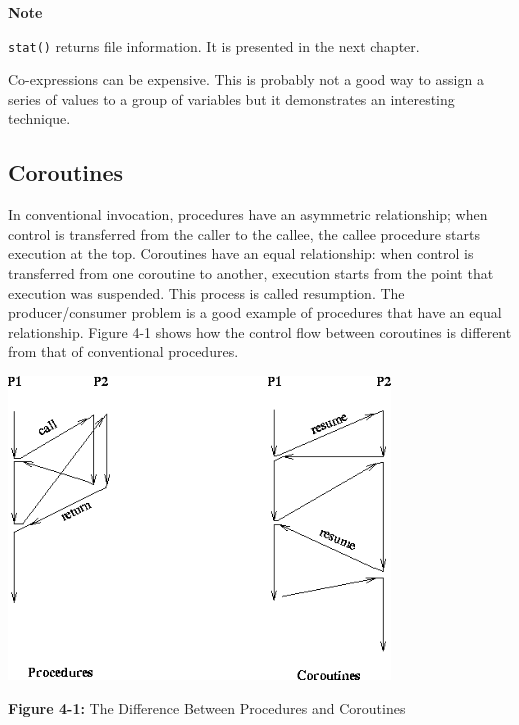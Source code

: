 
{\sffamily\bfseries
Note}

{\sffamily
\texttt{stat()} returns file information. It is presented in the next chapter.}

\noindent
Co-expressions can be expensive. This is probably not a
good way to assign a series of values to a group of variables but it
demonstrates an interesting technique.

\subsection{Coroutines}

In conventional invocation, procedures have an asymmetric
relationship; when control is transferred from the caller to the
callee, the callee procedure starts execution at the top. Coroutines
have an equal relationship: when control is transferred from one
coroutine to another, execution starts from the point that
execution was suspended. This process is called resumption. The
producer/consumer problem is a good example of
procedures that have an equal relationship. Figure 4-1 shows how the
control flow between coroutines is different from that of conventional
procedures.

{\centering \par}

\begin{center}
\includegraphics[width=3.9902in,height=3.1701in]{ub-img/ub-img8.png}
\end{center}

{\sffamily\bfseries Figure 4-1:}
{\sffamily The Difference Between Procedures and Coroutines}

